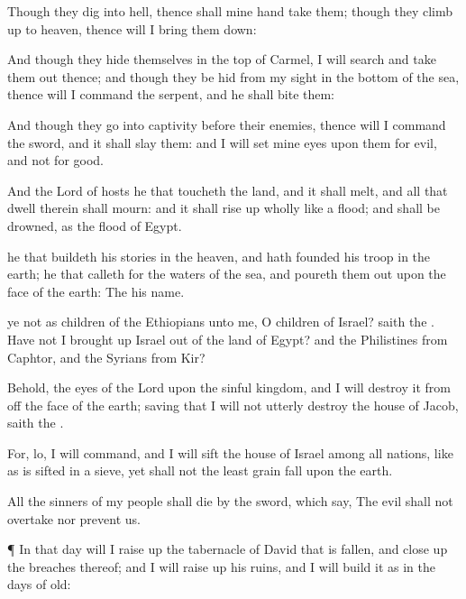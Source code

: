 {Though they
dig into
hell, thence shall mine
hand
take them; though they climb
up to
heaven, thence will I bring them
down:

And though they
hide themselves in the
top of
Carmel, I will
search and take them
out thence; and though they be
hid from my
sight in the
bottom of the
sea, thence will I
command the
serpent, and he shall
bite them:

And though they
go into
captivity
before their
enemies, thence will I
command the
sword, and it shall
slay them: and I will
set mine
eyes upon them for
evil, and not for
good.

And the
Lord
{} of
hosts
{} he that
toucheth the
land, and it shall
melt, and all that
dwell therein shall
mourn: and it shall rise
up wholly like a
flood; and shall be
drowned, as
{} the
flood of
Egypt.

 he that
buildeth his
stories in the
heaven, and hath
founded his
troop in the
earth; he that
calleth for the
waters of the
sea, and poureth them
out upon the
face of the
earth: The
{}
{} his
name.

 ye not as
children of the
Ethiopians unto me, O
children of
Israel?
saith the
{}. Have not I brought
up
Israel out of the
land of
Egypt? and the
Philistines from
Caphtor, and the
Syrians from
Kir?

Behold, the
eyes of the
Lord
{}
{} upon the
sinful
kingdom, and I will
destroy it from off the
face of the
earth;
saving that I will not
utterly
destroy the
house of
Jacob,
saith the
{}.

For, lo, I will
command, and I will
sift the
house of
Israel among all
nations, like as
{} is
sifted in a
sieve, yet shall not the least
grain
fall upon the
earth.

All the
sinners of my
people shall
die by the
sword, which
say, The
evil shall not
overtake nor
prevent us.


\par }{\PP {}¶ In that
day will I raise
up the
tabernacle of
David that is
fallen, and close
up the
breaches thereof; and I will raise
up his
ruins, and I will
build it as in the
days of
old:

}
